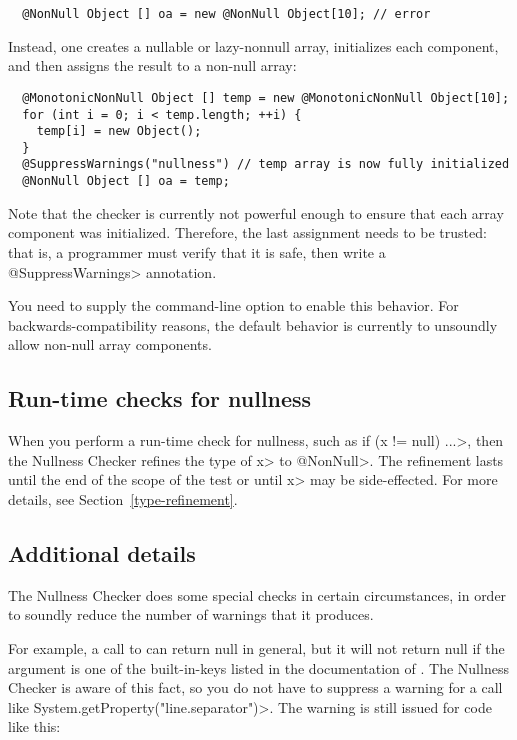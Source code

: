 \begin{Verbatim}
  @NonNull Object [] oa = new @NonNull Object[10]; // error
\end{Verbatim}

Instead, one creates a nullable or lazy-nonnull array, initializes
each component, and then assigns the result to a non-null array:

\begin{Verbatim}
  @MonotonicNonNull Object [] temp = new @MonotonicNonNull Object[10];
  for (int i = 0; i < temp.length; ++i) {
    temp[i] = new Object();
  }
  @SuppressWarnings("nullness") // temp array is now fully initialized
  @NonNull Object [] oa = temp;
\end{Verbatim}

Note that the checker is currently not powerful enough to ensure that
each array component was initialized. Therefore, the last assignment
needs to be trusted:  that is, a programmer must verify that it is safe,
then write a \<@SuppressWarnings> annotation.


You need to supply the 
command-line option to enable this behavior.
For backwards-compatibility reasons, the default behavior is currently
to unsoundly allow non-null array components.


\subsection{Run-time checks for nullness\label{nullness-runtime-checks}}

When you perform a run-time check for nullness, such as \<if (x != null)
...>, then the Nullness Checker refines the type of \<x> to
\<@NonNull>.  The refinement lasts until the end of the scope of the test
or until \<x> may be side-effected.  For more details, see
Section~\ref{type-refinement}.


\subsection{Additional details\label{nullness-additional-details}}

The Nullness Checker does some special checks in certain circumstances, in
order to soundly reduce the number of warnings that it produces.

For example, a call to
can return null in general, but it will not return null if the argument is
one of the built-in-keys listed in the documentation of
.
The Nullness Checker is aware of this fact, so you do not have to suppress
a warning for a call like \<System.getProperty("line.separator")>.  The
warning is still issued for code like this:

